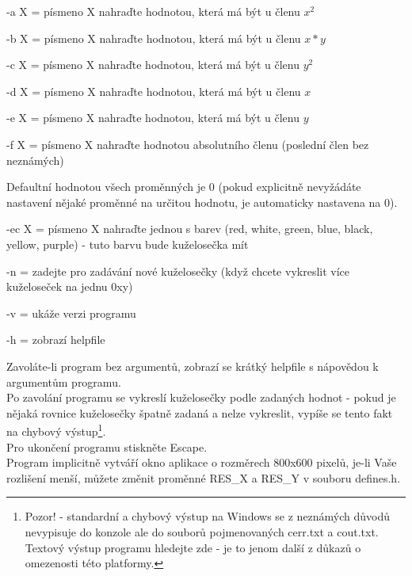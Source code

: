 \documentclass[a4paper,11pt,titlepage]{article}
\begin{document}
\begin{description}
\item -a X = písmeno X nahraďte hodnotou, která má být u členu $x^{2}$
\item -b X = písmeno X nahraďte hodnotou, která má být u členu $x*y$
\item -c X = písmeno X nahraďte hodnotou, která má být u členu $y^{2}$
\item -d X = písmeno X nahraďte hodnotou, která má být u členu $x$
\item -e X = písmeno X nahraďte hodnotou, která má být u členu $y$
\item -f X = písmeno X nahraďte hodnotou absolutního členu (poslední člen bez neznámých)
\end{description}

Defaultní hodnotou všech proměnných je 0 (pokud explicitně nevyžádáte nastavení nějaké proměnné na určitou hodnotu, je automaticky nastavena na 0).\linebreak[4]

\begin{description}
\item -ec X = písmeno X nahraďte jednou s barev (red, white, green, blue, black, yellow, purple) - tuto barvu bude kuželosečka mít
\item -n = zadejte pro zadávání nové kuželosečky (když chcete vykreslit více kuželoseček na jednu 0xy)
\item -v = ukáže verzi programu
\item -h = zobrazí helpfile
\end{description}

Zavoláte-li program bez argumentů, zobrazí se krátký helpfile s nápovědou k argumentům programu.\\

Po zavolání programu se vykreslí kuželosečky podle zadaných hodnot - pokud je nějaká rovnice kuželosečky špatně zadaná a nelze vykreslit, vypíše se tento fakt na chybový výstup\footnote{Pozor! - standardní a chybový výstup na Windows se z neznámých důvodů nevypisuje do konzole ale do souborů pojmenovaných cerr.txt a cout.txt. Textový výstup programu hledejte zde - je to jenom další z důkazů o omezenosti této platformy.}.\\

Pro ukončení programu stiskněte Escape.\\

Program implicitně vytváří okno aplikace o rozměrech 800x600 pixelů, je-li Vaše rozlišení menší, můžete změnit proměnné RES\_X a RES\_Y v souboru defines.h.\\
\end{document}
